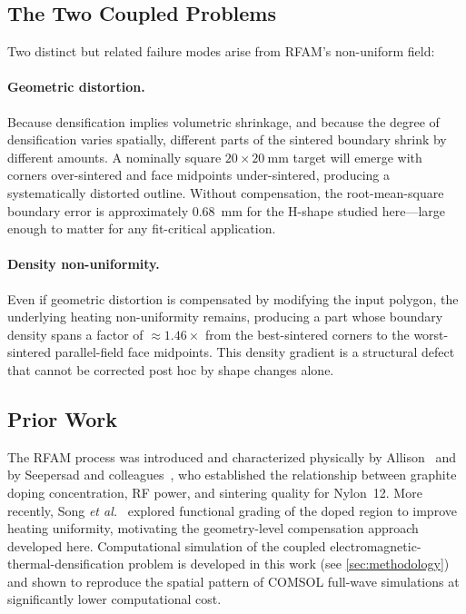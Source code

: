 \documentclass[5p,times]{elsarticle}
\begin{document}
\subsection{The Two Coupled Problems}

Two distinct but related failure modes arise from RFAM's non-uniform
field:

\paragraph{Geometric distortion.}
Because densification implies volumetric shrinkage, and because the
degree of densification varies spatially, different parts of the
sintered boundary shrink by different amounts.  A nominally square
$20 \times \SI{20}{\milli\meter}$ target will emerge with corners
over-sintered and face midpoints under-sintered, producing a
systematically distorted outline.  Without compensation, the
root-mean-square boundary error is approximately \SI{0.68}{\milli\meter}
for the H-shape studied here---large enough to matter for any
fit-critical application.

\paragraph{Density non-uniformity.}
Even if geometric distortion is compensated by modifying the input
polygon, the underlying heating non-uniformity remains, producing
a part whose boundary density spans a factor of $\approx 1.46\times$
from the best-sintered corners to the worst-sintered parallel-field
face midpoints.  This density gradient is a structural defect that
cannot be corrected post hoc by shape changes alone.

\subsection{Prior Work}

The RFAM process was introduced and characterized physically by
Allison~\cite{allisonDissertation} and by Seepersad and
colleagues~\cite{allison2022volumetric,allison2022computational}, who
established the relationship between graphite doping concentration,
RF power, and sintering quality for Nylon~12.  More recently, Song
\textit{et al.}~\cite{Song2025RFAMUniformity} explored functional
grading of the doped region to improve heating uniformity, motivating
the geometry-level compensation approach developed here.  Computational
simulation of the coupled electromagnetic-thermal-densification
problem is developed in this work (see \cref{sec:methodology}) and shown to
reproduce the spatial pattern of COMSOL full-wave simulations at
significantly lower computational cost.
\end{document}
